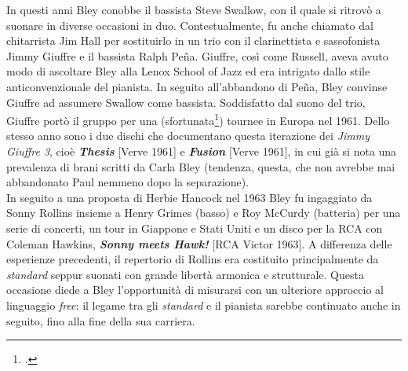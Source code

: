 In questi anni Bley conobbe il bassista Steve Swallow, con il quale si ritrovò a suonare in diverse occasioni in duo. Contestualmente, fu anche chiamato dal chitarrista Jim Hall per sostituirlo in un trio con il clarinettista e sassofonista Jimmy Giuffre e il bassista Ralph Peña. Giuffre, così come Russell, aveva avuto modo di ascoltare Bley alla Lenox School of Jazz ed era intrigato dallo stile anticonvenzionale del pianista. In seguito all'abbandono di Peña, Bley convinse Giuffre ad assumere Swallow come bassista. Soddisfatto dal suono del trio, Giuffre portò il gruppo per una (sfortunata\footcite[77]{stopping}) tournee in Europa nel 1961. Dello stesso anno sono i due dischi che documentano questa iterazione dei \textit{Jimmy Giuffre 3}, cioè \textit{\textbf{Thesis}} [Verve 1961] e \textit{\textbf{Fusion}} [Verve 1961], in cui già si nota una prevalenza di brani scritti da Carla Bley (tendenza, questa, che non avrebbe mai abbandonato Paul nemmeno dopo la separazione).\\
In seguito a una proposta di Herbie Hancock nel 1963 Bley fu ingaggiato da Sonny Rollins insieme a Henry Grimes (basso) e Roy McCurdy (batteria) per una serie di concerti, un tour in Giappone e Stati Uniti e un disco per la RCA con Coleman Hawkins, \textit{\textbf{Sonny meets Hawk!}} [RCA Victor 1963]. A differenza delle esperienze precedenti, il repertorio di Rollins era costituito principalmente da \textit{standard} seppur suonati con grande libertà armonica e strutturale. Questa occasione diede a Bley l'opportunità di misurarsi con un ulteriore approccio al linguaggio \textit{free}: il legame tra gli \textit{standard} e il pianista sarebbe continuato anche in seguito, fino alla fine della sua carriera.
